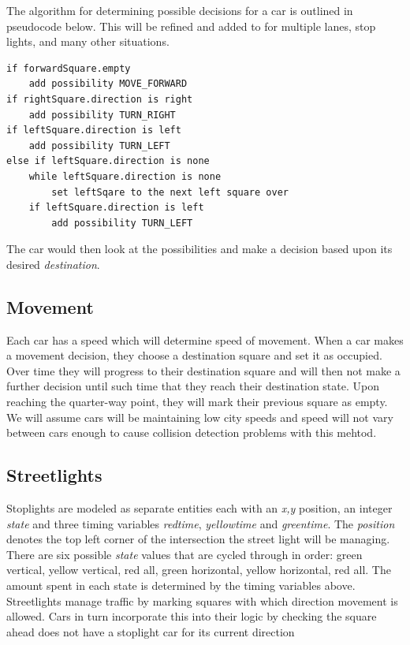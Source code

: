 \documentclass{article}
\begin{document}
\noindent The algorithm for determining possible decisions for a car is outlined in pseudocode below.  This will be refined and added to for multiple lanes, stop lights, and many other situations.

\begin{adjustwidth}{1.5em}{1.5em}
\begin{lstlisting}
if forwardSquare.empty
    add possibility MOVE_FORWARD
if rightSquare.direction is right
    add possibility TURN_RIGHT
if leftSquare.direction is left
    add possibility TURN_LEFT
else if leftSquare.direction is none
    while leftSquare.direction is none
        set leftSqare to the next left square over
    if leftSquare.direction is left
        add possibility TURN_LEFT
\end{lstlisting}
\end{adjustwidth}

\noindent The car would then look at the possibilities and make a decision based upon its desired \emph{destination}.

\subsection{Movement}

Each car has a speed which will determine speed of movement.  When a car makes a movement decision, they choose a destination square and set it as occupied. Over time they will progress to their destination square and will then not make a further decision until such time that they reach their destination state.  Upon reaching the quarter-way point, they will mark their previous square as empty.  We will assume cars will be maintaining low city speeds and speed will not vary between cars enough to cause collision detection problems with this mehtod.

\subsection{Streetlights}

Stoplights are modeled as separate entities each with an \emph{x,y} position, an integer \emph{state} and three timing variables \emph{redtime}, \emph{yellowtime} and \emph{greentime}.  The \emph{position} denotes the top left corner of the intersection the street light will be managing.  There are six possible \emph{state} values that are cycled through in order: green vertical, yellow vertical, red all, green horizontal, yellow horizontal, red all.  The amount spent in each state is determined by the timing variables above.\\
Streetlights manage traffic by marking squares with which direction movement is allowed.  Cars in turn incorporate this into their logic by checking the square ahead does not have a stoplight car for its current direction
\end{document}
